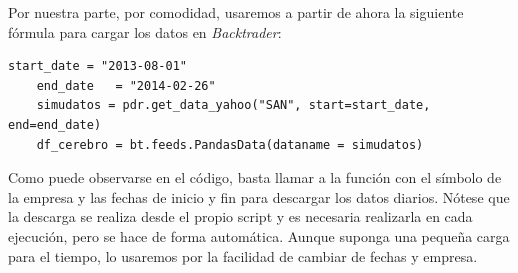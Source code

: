     Por nuestra parte, por comodidad, usaremos a partir de ahora la siguiente f\'ormula para cargar los datos en \textit{Backtrader}:\\
    
    \begin{lstlisting}[basicstyle=\tiny]
    start_date = "2013-08-01"
    end_date   = "2014-02-26"
    simudatos = pdr.get_data_yahoo("SAN", start=start_date, end=end_date)
    df_cerebro = bt.feeds.PandasData(dataname = simudatos)
    \end{lstlisting}
    
    Como puede observarse en el c\'odigo, basta llamar a la funci\'on con el s\'imbolo de la empresa y las fechas de inicio y fin para descargar los datos diarios. N\'otese que la descarga se realiza desde el propio script y es necesaria realizarla en cada ejecuci\'on, pero se hace de forma autom\'atica. Aunque suponga una peque\~na carga para el tiempo, lo usaremos por la  facilidad de cambiar de fechas y empresa.\\
    